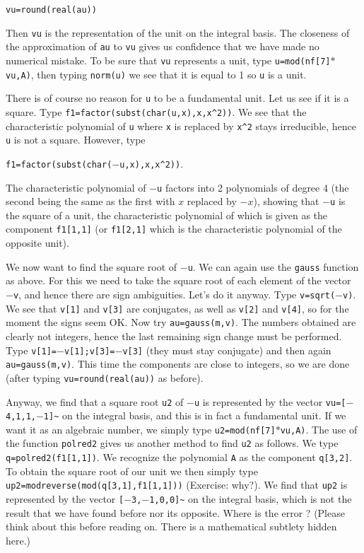 {\tt vu=round(real(au))}

Then {\tt vu} is the representation of the unit on the integral basis.
The closeness of the approximation of {\tt au} to {\tt vu} gives us
confidence that we have made no numerical mistake. To be sure that {\tt vu}
represents a unit, type {\tt u=mod(nf[7]$*$vu,A)}, then typing
{\tt norm(u)} we see that it is equal to 1 so {\tt u} is a unit.

There is of course no reason for {\tt u} to be a fundamental unit.
Let us see if it is a square. Type {\tt f1=factor(subst(char(u,x),x,x\^{}2))}.
We see that the characteristic polynomial of {\tt u} where {\tt x}
is replaced by {\tt x\^{}2} stays irreducible, hence {\tt u} is not a square.
However, type 

{\tt f1=factor(subst(char($-$u,x),x,x\^{}2))}. 

The characteristic
polynomial of {\tt $-$u} factors into 2 polynomials of degree 4 
(the second being the same as the first with $x$ replaced by $-x$),
showing that {\tt $-$u} is the square of a unit, the characteristic polynomial
of which is given as the component {\tt f1[1,1]} (or {\tt f1[2,1]} which is
the characteristic polynomial of the opposite unit). 

We now want to find the square root of {\tt $-$u}. We can again use the 
{\tt gauss} function as above. For this we need to take the square
root of each element of the vector {\tt $-$v}, and hence there are
sign ambiguities. Let's do it anyway. Type {\tt v=sqrt($-$v)}. We see that
{\tt v[1]} and {\tt v[3]} are conjugates, as well as {\tt v[2]} and {\tt v[4]},
so for the moment the signs seem OK. Now try {\tt au=gauss(m,v)}. The numbers
obtained are clearly not integers, hence the last remaining sign change must
be performed. Type {\tt v[1]=$-$v[1];v[3]=$-$v[3]} (they must stay conjugate)
and then again {\tt au=gauss(m,v)}. This time the components are close to 
integers, so we are done (after typing {\tt vu=round(real(au))} as before).

Anyway, we find that a square root {\tt u2} of {\tt $-$u} is represented by the 
vector {\tt vu=[$-$4,1,1,$-$1]\~{}} on the integral basis, and this is in fact a
fundamental unit. If we want it as an algebraic number, we simply type
{\tt u2=mod(nf[7]$*$vu,A)}.
\medskip
The use of the function {\tt polred2} gives us another method to find
{\tt u2} as follows. We type {\tt q=polred2(f1[1,1])}. We
recognize the polynomial {\tt A} as the component {\tt q[3,2]}. To 
obtain the square root of our unit we then simply type
{\tt up2=modreverse(mod(q[3,1],f1[1,1]))} (Exercise: why?). We find that
{\tt up2} is represented by the vector {\tt [$-$3,$-$1,0,0]\~{}}
on the integral basis, which is not the result that we have found before
nor its opposite. Where is the error ? (Please think about this before
reading on. There is a mathematical subtlety hidden here.)

